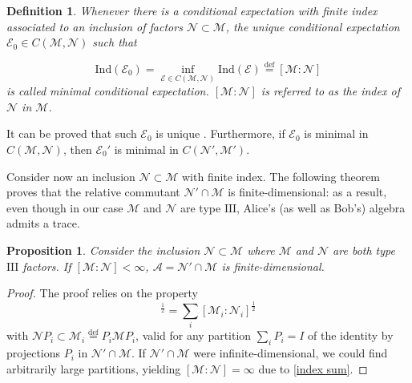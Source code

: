 \documentclass[a4paper,11pt]{article}
\newcommand{\eqdef}{\overset{\mathrm{def}}{=}}
\newtheorem{Definition}{Definition}[subsection]
\newtheorem{Proposition}{Proposition}[subsection]
\begin{document}
\begin{Definition}
    Whenever there is a conditional expectation with finite index associated to an inclusion of factors $\mathcal{N} \subset \mathcal{M}$, the unique conditional expectation $\mathcal{E}_0 \in C(\mathcal{M}, \mathcal{N})$ such that

    \begin{equation}
        \mathrm{Ind}(\mathcal{E}_0) = \inf_{\mathcal{E} \in C(\mathcal{M}, \mathcal{N})} \mathrm{Ind}(\mathcal{E}) \eqdef [\mathcal{M} : \mathcal{N}]
    \end{equation}
    is called \textnormal{minimal conditional expectation}. $[\mathcal{M} : \mathcal{N}]$ is referred to as the \textnormal{index} of $\mathcal{N}$ in $\mathcal{M}$.
\end{Definition}

It can be proved that such $\mathcal{E}_0$ is unique \cite{Connes}. Furthermore, if $\mathcal{E}_0$ is minimal in $C(\mathcal{M}, \mathcal{N})$, then $\mathcal{E}_0'$ is minimal in $C(\mathcal{N}', \mathcal{M}')$.

Consider now an inclusion $\mathcal{N} \subset \mathcal{M}$ with finite index. The following theorem proves that the relative commutant $\mathcal{N}' \cap \mathcal{M}$ is finite-dimensional: as a result, even though in our case $\mathcal{M}$ and $\mathcal{N}$ are type $\mathrm{III}$, Alice's (as well as Bob's) algebra admits a trace.

\begin{Proposition}
    Consider the inclusion $\mathcal{N} \subset \mathcal{M}$ where $\mathcal{M}$ and $\mathcal{N}$ are both type $\mathrm{III}$ factors. If $[\mathcal{M} : \mathcal{N}] < \infty$, $\mathcal{A} = \mathcal{N'} \cap \mathcal{M}$ is finite-dimensional.
\end{Proposition}

\begin{proof}
    The proof relies on the property
    \begin{equation}
        [\mathcal{M}:\mathcal{N}]^{\frac{1}{2}} = \sum_i [\mathcal{M}_i:\mathcal{N}_i]^{\frac{1}{2}}
        \label{index sum}
    \end{equation}
    with $\mathcal{N} P_i \subset \mathcal{M}_i \eqdef P_i \mathcal{M} P_i$, valid for any partition $\sum_i P_i = I$ of the identity by projections $P_i$ in $\mathcal{N}' \cap \mathcal{M}$.
    If $\mathcal{N}' \cap \mathcal{M}$ were infinite-dimensional, we could find arbitrarily large partitions, yielding $[\mathcal{M}:\mathcal{N}] = \infty$ due to \ref{index sum}.
\end{proof}
\end{document}
